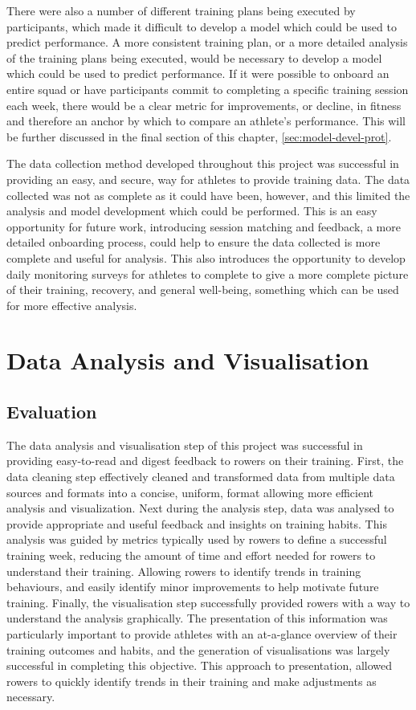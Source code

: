 There were also a number of different training plans being executed by participants, which made it difficult to develop a model which could be used to predict performance. A more consistent training plan, or a more detailed analysis of the training plans being executed, would be necessary to develop a model which could be used to predict performance. If it were possible to onboard an entire squad or have participants commit to completing a specific training session each week, there would be a clear metric for improvements, or decline, in fitness and therefore an anchor by which to compare an athlete's performance. This will be further discussed in the final section of this chapter, \autoref{sec:model-devel-prot}.

The data collection method developed throughout this project was successful in providing an easy, and secure, way for athletes to provide training data. The data collected was not as complete as it could have been, however, and this limited the analysis and model development which could be performed. This is an easy opportunity for future work, introducing session matching and feedback, a more detailed onboarding process, could help to ensure the data collected is more complete and useful for analysis. This also introduces the opportunity to develop daily monitoring surveys for athletes to complete to give a more complete picture of their training, recovery, and general well-being, something which can be used for more effective analysis.

\section{Data Analysis and Visualisation}
\subsection{Evaluation}
The data analysis and visualisation step of this project was successful in providing easy-to-read and digest feedback to rowers on their training. First, the data cleaning step effectively cleaned and transformed data from multiple data sources and formats into a concise, uniform, format allowing more efficient analysis and visualization. Next during the analysis step, data was analysed to provide appropriate and useful feedback and insights on training habits. This analysis was guided by metrics typically used by rowers to define a successful training week, reducing the amount of time and effort needed for rowers to understand their training. Allowing rowers to identify trends in training behaviours, and easily identify minor improvements to help motivate future training. Finally, the visualisation step successfully provided rowers with a way to understand the analysis graphically. The presentation of this information was particularly important to provide athletes with an at-a-glance overview of their training outcomes and habits, and the generation of visualisations was largely successful in completing this objective. This approach to presentation, allowed rowers to quickly identify trends in their training and make adjustments as necessary.

